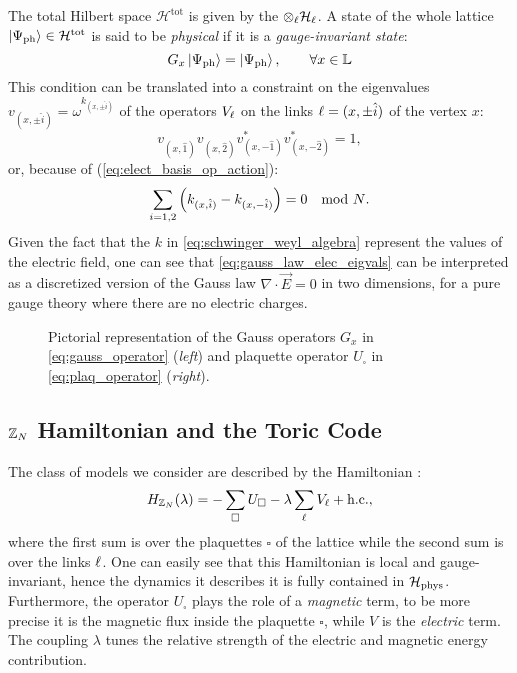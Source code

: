 The total Hilbert space $\mathcal{H}^{\text{tot}}$ is given by the $\otimes_{\ell} \mathcal{H}_{\ell}$.
A state of the whole lattice $\ket{\Psi_{\text{ph}}} \in \mathcal{H}^{\text{tot}}$ is said to be \emph{physical} if it is a \emph{gauge-invariant state}:
\begin{equation}
    G_x \ket{\Psi_{\text{ph}}} = \ket{\Psi_{\text{ph}}}, \qquad \forall x \in \mathbb{L}
    \label{eq:gauss_law}
\end{equation}
This condition can be translated into a constraint on the eigenvalues $v_{(x, \pm \hat{i})}= \omega^{k_{(x, \pm \hat{i})} }$  of the operators $V_\ell$ on the links $\ell = (x, \pm \hat{i})$ of the vertex $x$:
\begin{equation}
    v_{(x, \hat{1})}^{\phantom{\ast}}
    v_{(x, \hat{2})}^{\phantom{\ast}}
    v_{(x, -\hat{1})}^\ast
    v_{(x, -\hat{2})}^\ast = 1,
\end{equation}
or, because of (\ref{eq:elect_basis_op_action}):
\begin{equation}
    \sum_{i=1,2} \pqty{ k_{(x, \hat{i})} - k_{(x, -\hat{i})} } = 0 \quad \text{mod $N$}.
    \label{eq:gauss_law_elec_eigvals}
\end{equation}
Given the fact that the $k$ in \eqref{eq:schwinger_weyl_algebra} represent the values of the electric field, one can see that \eqref{eq:gauss_law_elec_eigvals} can be interpreted as a discretized version of the Gauss law $\nabla \cdot \vec{E} = 0$ in two dimensions,
for a pure gauge theory where there are no electric charges.


\begin{figure}[t]
    \centering
    
    \caption{Pictorial representation of the Gauss operators $G_x$ in \eqref{eq:gauss_operator} (\emph{left}) and plaquette operator $U_{\square}$ in \eqref{eq:plaq_operator} (\emph{right}).}
    \label{fig:star_plaq_operators}
\end{figure}


\subsection{\texorpdfstring{$\mathbb{Z}_N$}{Z\_N} Hamiltonian and the Toric Code}%
\label{sub:hamiltonian}

The class of models we consider are described by the Hamiltonian \cite{tagliacozzo2011entanglement, hamma2008adiabatic, trebst2007topological}:
\begin{equation}
    H_{\mathbb{Z}_N}(\lambda) = - \sum_{\square} U_{\square} - \lambda \sum_{\ell} V_{\ell} + \text{h.c.},
    \label{eq:hamiltonian_base}
\end{equation}
where the first sum is over the plaquettes $\square$ of the lattice while the second sum is over the links $\ell$.
One can easily see that this Hamiltonian is local and gauge-invariant, hence the dynamics it describes it is fully contained in $\mathcal{H}_{\text{phys}}$.
Furthermore, the operator $U_{\square}$ plays the role of a \emph{magnetic} term, to be more precise it is the magnetic flux inside the plaquette $\square$, while $V$ is the \emph{electric} term.
The coupling $\lambda$ tunes the relative strength of the electric and magnetic energy contribution.

